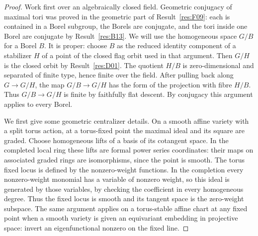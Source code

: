 \documentclass[11pt,a4paper,openany,oneside]{book}
\theoremstyle{resultstyle}
\theoremstyle{definition}
\numberwithin{equation}{chapter}
\begin{document}
\begin{proof}
Work first over an algebraically closed field. Geometric conjugacy
of maximal tori was proved in the geometric part of
Result~\ref{res:F09}: each is contained in a Borel subgroup, the
Borels are conjugate, and the tori inside one Borel are conjugate
by Result~\ref{res:B13}. We will use the homogeneous space \(G/B\)
for a Borel \(B\). It is proper: choose \(B\) as the reduced
identity component of a stabilizer \(H\) of a point of the
closed flag orbit used in that argument. Then \(G/H\) is the
closed orbit by Result~\ref{res:D01}. The quotient \(H/B\)
is zero-dimensional and separated of finite type, hence
finite over the field. After pulling back along \(G\to G/H\),
the map \(G/B\to G/H\) has the form of the projection with
fibre \(H/B\). Thus \(G/B\to G/H\) is finite by faithfully flat
descent. By conjugacy this argument applies to every Borel.

We first give some geometric centralizer details. On a smooth affine
variety with a split torus action, at a torus-fixed point the
maximal ideal and its square are graded. Choose homogeneous lifts
of a basis of its cotangent space. In the completed local ring
these lifts are formal power series coordinates: their maps on
associated graded rings are isomorphisms, since the point is
smooth. The torus fixed locus is defined by the nonzero-weight
functions. In the completion every nonzero-weight monomial has
a variable of nonzero weight, so this ideal is generated by those
variables, by checking the coefficient in every homogeneous
degree. Thus the fixed locus is smooth and its tangent space
is the zero-weight subspace. The same argument applies on a
torus-stable affine chart at any fixed point when a smooth variety
is given an equivariant embedding in projective space: invert an
eigenfunctional nonzero on the fixed line.


\end{proof}
\end{document}
